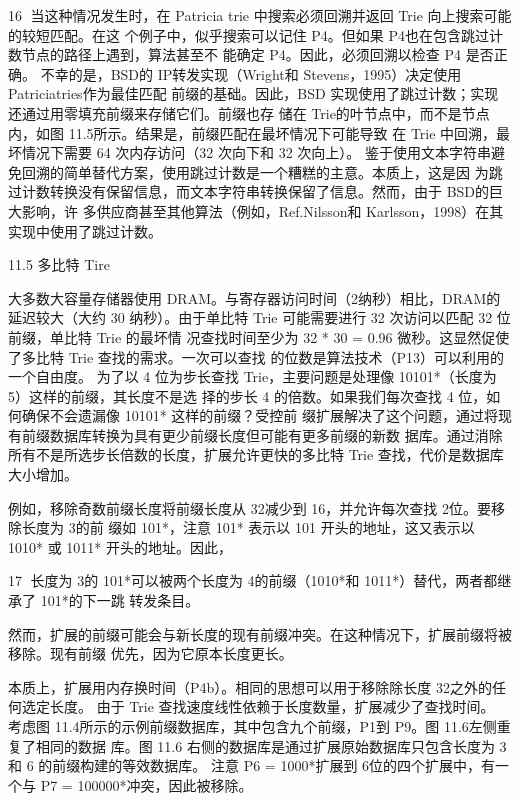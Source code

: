                                                        16
当这种情况发生时，在 Patricia trie 中搜索必须回溯并返回 Trie 向上搜索可能的较短匹配。在这
个例子中，似乎搜索可以记住 P4。但如果 P4也在包含跳过计数节点的路径上遇到，算法甚至不
能确定 P4。因此，必须回溯以检查 P4 是否正确。
不幸的是，BSD的 IP转发实现（Wright和 Stevens，1995）决定使用 Patriciatries作为最佳匹配
前缀的基础。因此，BSD 实现使用了跳过计数；实现还通过用零填充前缀来存储它们。前缀也存
储在 Trie的叶节点中，而不是节点内，如图 11.5所示。结果是，前缀匹配在最坏情况下可能导致
在 Trie 中回溯，最坏情况下需要 64 次内存访问（32 次向下和 32 次向上）。
鉴于使用文本字符串避免回溯的简单替代方案，使用跳过计数是一个糟糕的主意。本质上，这是因
为跳过计数转换没有保留信息，而文本字符串转换保留了信息。然而，由于 BSD的巨大影响，许
多供应商甚至其他算法（例如，Ref.Nilsson和 Karlsson，1998）在其实现中使用了跳过计数。




11.5 多比特 Tire


大多数大容量存储器使用 DRAM。与寄存器访问时间（2纳秒）相比，DRAM的延迟较大（大约
30 纳秒）。由于单比特 Trie 可能需要进行 32 次访问以匹配 32 位前缀，单比特 Trie 的最坏情
况查找时间至少为 32 * 30 = 0.96 微秒。这显然促使了多比特 Trie 查找的需求。一次可以查找
的位数是算法技术（P13）可以利用的一个自由度。
为了以 4 位为步长查找 Trie，主要问题是处理像 10101*（长度为 5）这样的前缀，其长度不是选
择的步长 4 的倍数。如果我们每次查找 4 位，如何确保不会遗漏像 10101* 这样的前缀？受控前
缀扩展解决了这个问题，通过将现有前缀数据库转换为具有更少前缀长度但可能有更多前缀的新数
据库。通过消除所有不是所选步长倍数的长度，扩展允许更快的多比特 Trie 查找，代价是数据库
大小增加。

例如，移除奇数前缀长度将前缀长度从 32减少到 16，并允许每次查找 2位。要移除长度为 3的前
缀如 101*，注意 101* 表示以 101 开头的地址，这又表示以 1010* 或 1011* 开头的地址。因此，

                                                            17
长度为 3的 101*可以被两个长度为 4的前缀（1010*和 1011*）替代，两者都继承了 101*的下一跳
转发条目。

然而，扩展的前缀可能会与新长度的现有前缀冲突。在这种情况下，扩展前缀将被移除。现有前缀
优先，因为它原本长度更长。

本质上，扩展用内存换时间（P4b）。相同的思想可以用于移除除长度 32之外的任何选定长度。
由于 Trie 查找速度线性依赖于长度数量，扩展减少了查找时间。
考虑图 11.4所示的示例前缀数据库，其中包含九个前缀，P1到 P9。图 11.6左侧重复了相同的数据
库。图 11.6 右侧的数据库是通过扩展原始数据库只包含长度为 3 和 6 的前缀构建的等效数据库。
注意 P6 = 1000*扩展到 6位的四个扩展中，有一个与 P7 = 100000*冲突，因此被移除。




